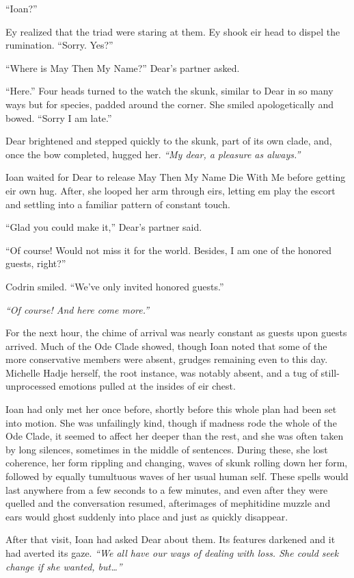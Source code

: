 ``Ioan?''

Ey realized that the triad were staring at them. Ey shook eir head to dispel the rumination. ``Sorry. Yes?''

``Where is May Then My Name?'' Dear's partner asked.

``Here.'' Four heads turned to the watch the skunk, similar to Dear in so many ways but for species, padded around the corner. She smiled apologetically and bowed. ``Sorry I am late.''

Dear brightened and stepped quickly to the skunk, part of its own clade, and, once the bow completed, hugged her. \emph{``My dear, a pleasure as always.''}

Ioan waited for Dear to release May Then My Name Die With Me before getting eir own hug. After, she looped her arm through eirs, letting em play the escort and settling into a familiar pattern of constant touch.

``Glad you could make it,'' Dear's partner said.

``Of course! Would not miss it for the world. Besides, I am one of the honored guests, right?''

Codrin smiled. ``We've only invited honored guests.''

\emph{``Of course! And here come more.''}

For the next hour, the chime of arrival was nearly constant as guests upon guests arrived. Much of the Ode Clade showed, though Ioan noted that some of the more conservative members were absent, grudges remaining even to this day. Michelle Hadje herself, the root instance, was notably absent, and a tug of still-unprocessed emotions pulled at the insides of eir chest.

Ioan had only met her once before, shortly before this whole plan had been set into motion. She was unfailingly kind, though if madness rode the whole of the Ode Clade, it seemed to affect her deeper than the rest, and she was often taken by long silences, sometimes in the middle of sentences. During these, she lost coherence, her form rippling and changing, waves of skunk rolling down her form, followed by equally tumultuous waves of her usual human self. These spells would last anywhere from a few seconds to a few minutes, and even after they were quelled and the conversation resumed, afterimages of mephitidine muzzle and ears would ghost suddenly into place and just as quickly disappear.

After that visit, Ioan had asked Dear about them. Its features darkened and it had averted its gaze. \emph{``We all have our ways of dealing with loss. She could seek change if she wanted, but\ldots{}''}

